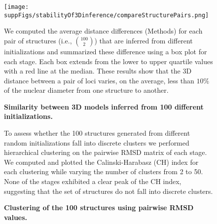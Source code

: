 \documentclass{article}
\begin{document}
\setcounter{figure}{3} %
\clearpage
\thispagestyle{plain}
\pagestyle{plain}

\begin{figure}
  \begin{center}
  \texttt{[image: suppFigs/stabilityOf3Dinference/compareStructurePairs.png]}
   \end{center}
\caption{{\bf Similarity between 3D models inferred from 100 different initializations.}}
{We computed the average distance differences (Methods) for each pair of structures
(i.e., ${100 \choose 2}$) that are inferred from different initializations and
summarized these difference using a box plot for each stage. Each box extends from the
lower to upper quartile values with a red line at the median. These results show that
the 3D distance between a pair of loci varies, on the average, less than $10\%$ of the
nuclear diameter from one structure to another.
}
\label{suppfig:compareStructurePairs}
\end{figure}
\clearpage

\begin{figure}
  \begin{center}
   \hspace{0.15\textwidth}
  \hspace{0.15\textwidth}
   \end{center}
\caption{{\bf Clustering of the 100 structures using pairwise RMSD values.}}
{ To assess whether the 100 structures generated from different random initializations fall into 
discrete clusters we performed hierarchical clustering on the pairwise RMSD matrix of each 
stage. We computed and plotted the Calinski-Harabasz (CH) 
index \cite{calinski:dendrite} for each clustering while varying the number of clusters from 2 to 50. 
None of the stages exhibited a clear peak of the CH index, suggesting that the set of structures do not fall into discrete clusters.
}
\label{suppfig:CHindices}
\end{figure}
\clearpage
\end{document}
